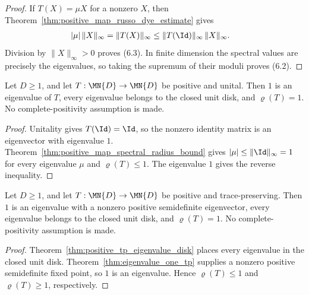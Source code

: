 \begin{proof}\leanok
    If $T(X)=\mu X$ for a nonzero $X$, then
    Theorem~\ref{thm:positive_map_russo_dye_estimate} gives
    \begin{align}
        |\mu|\,\|X\|_\infty
        &=\|T(X)\|_\infty
        \leq\|T(\Id)\|_\infty\,\|X\|_\infty.
        \notag
    \end{align}
    Division by $\|X\|_\infty>0$ proves (6.3). In finite dimension the
    spectral values are precisely the eigenvalues, so taking the supremum of
    their moduli proves (6.2).
\end{proof}

\begin{theorem}
    \label{thm:positive_unital_spectral_radius}
    \leanok
    Let $D\geq1$, and let $T:\MN{D}\to\MN{D}$ be positive and unital. Then
    $1$ is an eigenvalue of $T$, every eigenvalue belongs to the closed unit
    disk, and $\varrho(T)=1$. No complete-positivity assumption is made.
\end{theorem}

\begin{proof}\leanok
    Unitality gives $T(\Id)=\Id$, so the nonzero identity matrix is an
    eigenvector with eigenvalue $1$. Theorem~\ref{thm:positive_map_spectral_radius_bound}
    gives $|\mu|\leq\|\Id\|_\infty=1$ for every eigenvalue $\mu$ and
    $\varrho(T)\leq1$. The eigenvalue $1$ gives the reverse inequality.
\end{proof}

\begin{theorem}
    \label{thm:positive_tp_spectral_radius}
    \leanok
    Let $D\geq1$, and let $T:\MN{D}\to\MN{D}$ be positive and
    trace-preserving. Then $1$ is an eigenvalue with a nonzero positive
    semidefinite eigenvector, every eigenvalue belongs to the closed unit
    disk, and $\varrho(T)=1$. No complete-positivity assumption is made.
\end{theorem}

\begin{proof}\leanok
    Theorem~\ref{thm:positive_tp_eigenvalue_disk} places every eigenvalue in
    the closed unit disk. Theorem~\ref{thm:eigenvalue_one_tp} supplies a
    nonzero positive semidefinite fixed point, so $1$ is an eigenvalue.
    Hence $\varrho(T)\leq1$ and $\varrho(T)\geq1$, respectively.
\end{proof}

